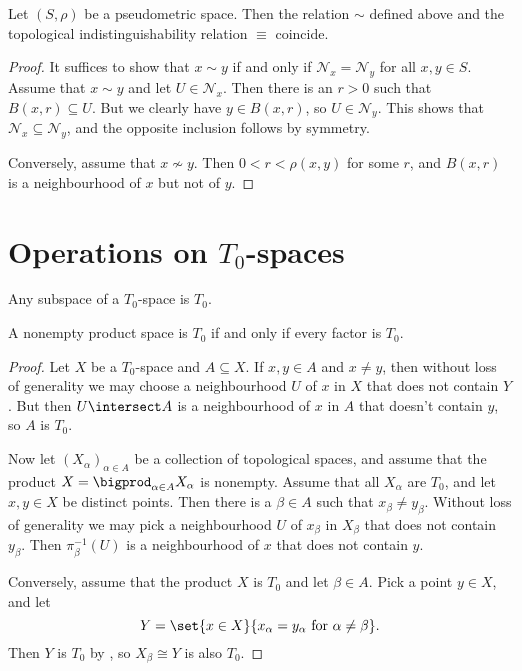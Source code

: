 \documentclass[article, a4paper, 11pt, oneside]{memoir}
\numberwithin{equation}{chapter}
\newcommand{\preim}{^{-1}}
\newcommand{\calN}{\mathcal{N}}
\newcommand{\nhoodfilter}[1]{\calN_{#1}}
\begin{document}
\begin{proposition}
    Let $(S,\rho)$ be a pseudometric space. Then the relation $\sim$ defined above and the topological indistinguishability relation $\equiv$ coincide.
\end{proposition}

\begin{proof}
    It suffices to show that $x \sim y$ if and only if $\nhoodfilter{x} = \nhoodfilter{y}$ for all $x,y \in S$. Assume that $x \sim y$ and let $U \in \nhoodfilter{x}$. Then there is an $r > 0$ such that $B(x,r) \subseteq U$. But we clearly have $y \in B(x,r)$, so $U \in \nhoodfilter{y}$. This shows that $\nhoodfilter{x} \subseteq \nhoodfilter{y}$, and the opposite inclusion follows by symmetry.

    Conversely, assume that $x \not\sim y$. Then $0 < r < \rho(x,y)$ for some $r$, and $B(x,r)$ is a neighbourhood of $x$ but not of $y$.
\end{proof}


\section[Operations on T0-spaces][Operations on $T_0$-spaces]{Operations on $T_0$-spaces}


\begin{proposition}
    \label{thm:T0-properties}
    \begin{enumprop}
        \item \label{enum:T0-subspace} Any subspace of a $T_0$-space is $T_0$.
        \item A nonempty product space is $T_0$ if and only if every factor is $T_0$.
    \end{enumprop}
\end{proposition}

\begin{proof}
    Let $X$ be a $T_0$-space and $A \subseteq X$. If $x,y \in A$ and $x \neq y$, then without loss of generality we may choose a neighbourhood $U$ of $x$ in $X$ that does not contain $Y$. But then $U \intersect A$ is a neighbourhood of $x$ in $A$ that doesn't contain $y$, so $A$ is $T_0$.

    Now let $(X_\alpha)_{\alpha \in A}$ be a collection of topological spaces, and assume that the product $X = \bigprod_{\alpha \in A} X_\alpha$ is nonempty. Assume that all $X_\alpha$ are $T_0$, and let $x,y \in X$ be distinct points. Then there is a $\beta \in A$ such that $x_\beta \neq y_\beta$. Without loss of generality we may pick a neighbourhood $U$ of $x_\beta$ in $X_\beta$ that does not contain $y_\beta$. Then $\pi_\beta\preim(U)$ is a neighbourhood of $x$ that does not contain $y$.

    Conversely, assume that the product $X$ is $T_0$ and let $\beta \in A$. Pick a point $y \in X$, and let
    \begin{equation*}
        Y
            = \set{x \in X}{x_\alpha = y_\alpha \text{ for } \alpha \neq \beta}.
    \end{equation*}
    Then $Y$ is $T_0$ by , so $X_\beta \cong Y$ is also $T_0$.
\end{proof}
\end{document}
